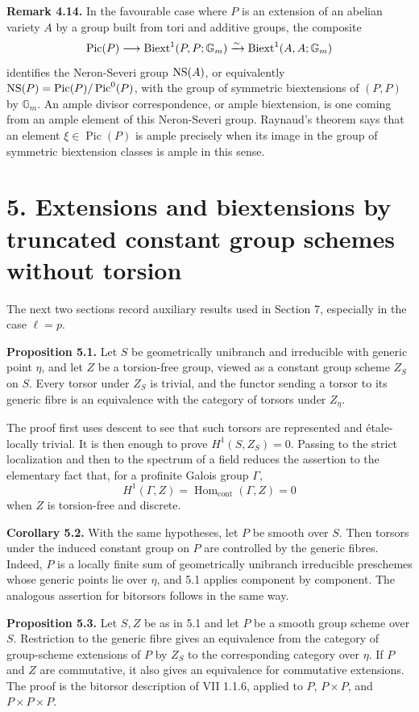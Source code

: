 \documentclass[11pt]{article}
\providecommand{\Pic}{\operatorname{Pic}}
\providecommand{\Gm}{\mathbb G_m}
\providecommand{\Hom}{\operatorname{Hom}}
\begin{document}
\textbf{Remark 4.14.}  In the favourable case where \(P\) is an extension of an abelian variety \(A\) by a group built from tori and additive groups, the composite
\[
  \Pic(P)\longrightarrow \Biext^1(P,P;\Gm)
     \xrightarrow{\sim}\Biext^1(A,A;\Gm)
\]
identifies the Neron-Severi group \(\operatorname{NS}(A)\), or equivalently \(\NS(P)=\Pic(P)/\Pic^0(P)\), with the group of symmetric biextensions of \((P,P)\) by \(\Gm\).  An ample divisor correspondence, or ample biextension, is one coming from an ample element of this Neron-Severi group.  Raynaud's theorem says that an element \(\xi\in\Pic(P)\) is ample precisely when its image in the group of symmetric biextension classes is ample in this sense.

\section*{5. Extensions and biextensions by truncated constant group schemes without torsion}

The next two sections record auxiliary results used in Section 7, especially in the case \(\ell=p\).

\textbf{Proposition 5.1.}  Let \(S\) be geometrically unibranch and irreducible with generic point \(\eta\), and let \(Z\) be a torsion-free group, viewed as a constant group scheme \(Z_S\) on \(S\).  Every torsor under \(Z_S\) is trivial, and the functor sending a torsor to its generic fibre is an equivalence with the category of torsors under \(Z_\eta\).

The proof first uses descent to see that such torsors are represented and étale-locally trivial.  It is then enough to prove \(H^1(S,Z_S)=0\).  Passing to the strict localization and then to the spectrum of a field reduces the assertion to the elementary fact that, for a profinite Galois group \(\Gamma\),
\[
  H^1(\Gamma,Z)=\Hom_{\mathrm{cont}}(\Gamma,Z)=0
\]
when \(Z\) is torsion-free and discrete.

\textbf{Corollary 5.2.}  With the same hypotheses, let \(P\) be smooth over \(S\).  Then torsors under the induced constant group on \(P\) are controlled by the generic fibres.  Indeed, \(P\) is a locally finite sum of geometrically unibranch irreducible preschemes whose generic points lie over \(\eta\), and 5.1 applies component by component.  The analogous assertion for bitorsors follows in the same way.

\textbf{Proposition 5.3.}  Let \(S,Z\) be as in 5.1 and let \(P\) be a smooth group scheme over \(S\).  Restriction to the generic fibre gives an equivalence from the category of group-scheme extensions of \(P\) by \(Z_S\) to the corresponding category over \(\eta\).  If \(P\) and \(Z\) are commutative, it also gives an equivalence for commutative extensions.  The proof is the bitorsor description of VII 1.1.6, applied to \(P\), \(P\times P\), and \(P\times P\times P\).
\end{document}
